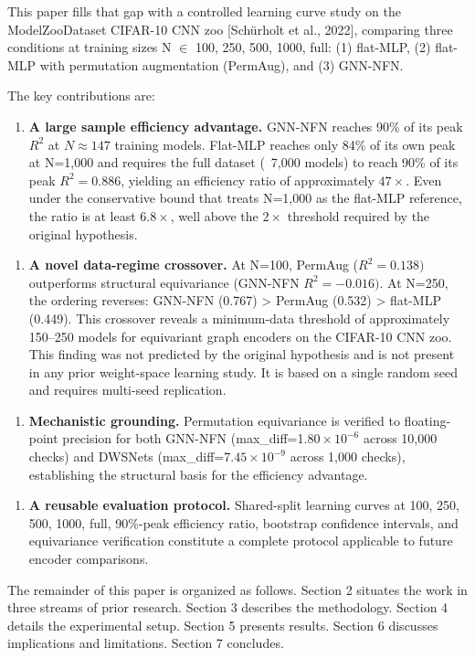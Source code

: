 This paper fills that gap with a controlled learning curve study on the ModelZooDataset CIFAR-10 CNN zoo [Schürholt et al., 2022], comparing three conditions at training sizes N $\in$ {100, 250, 500, 1000, full}: (1) flat-MLP, (2) flat-MLP with permutation augmentation (PermAug), and (3) GNN-NFN.

The key contributions are:

\begin{enumerate}
\item \textbf{A large sample efficiency advantage.} GNN-NFN reaches 90\% of its peak $R^2$ at $N\approx 147$ training models. Flat-MLP reaches only 84\% of its own peak at N=1,000 and requires the full dataset (~7,000 models) to reach 90\% of its peak $R^{2}=0.886$, yielding an efficiency ratio of approximately $47\times$. Even under the conservative bound that treats N=1,000 as the flat-MLP reference, the ratio is at least 6.$8\times$, well above the $2\times$ threshold required by the original hypothesis.
\end{enumerate}

\begin{enumerate}
\item \textbf{A novel data-regime crossover.} At N=100, PermAug ($R^{2}=0.138)$ outperforms structural equivariance (GNN-NFN $R^{2}=-0.016)$. At N=250, the ordering reverses: GNN-NFN (0.767) > PermAug (0.532) > flat-MLP (0.449). This crossover reveals a minimum-data threshold of approximately 150--250 models for equivariant graph encoders on the CIFAR-10 CNN zoo. This finding was not predicted by the original hypothesis and is not present in any prior weight-space learning study. It is based on a single random seed and requires multi-seed replication.
\end{enumerate}

\begin{enumerate}
\item \textbf{Mechanistic grounding.} Permutation equivariance is verified to floating-point precision for both GNN-NFN (max\_diff=1.$80\times 10^{-6}$ across 10,000 checks) and DWSNets (max\_diff=7.$45\times 10^{-9}$ across 1,000 checks), establishing the structural basis for the efficiency advantage.
\end{enumerate}

\begin{enumerate}
\item \textbf{A reusable evaluation protocol.} Shared-split learning curves at {100, 250, 500, 1000, full}, 90\%-peak efficiency ratio, bootstrap confidence intervals, and equivariance verification constitute a complete protocol applicable to future encoder comparisons.
\end{enumerate}

The remainder of this paper is organized as follows. Section 2 situates the work in three streams of prior research. Section 3 describes the methodology. Section 4 details the experimental setup. Section 5 presents results. Section 6 discusses implications and limitations. Section 7 concludes.

